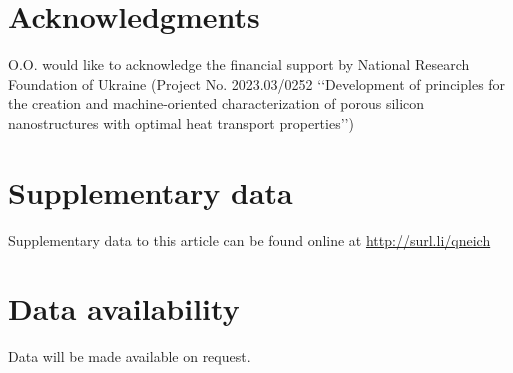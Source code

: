 \documentclass[a4paper,fleqn]{cas-sc}
\begin{document}
\section*{Acknowledgments}
O.O. would like to acknowledge the financial support by
National Research Foundation of Ukraine (Project No. 2023.03/0252
‘‘Development of principles for the creation and machine-oriented
characterization of porous silicon nanostructures with optimal
heat transport properties’’)

\section*{Supplementary data}\label{SuplData}
Supplementary data to this article can be found online at
\url{http://surl.li/qneich}

\section*{Data availability}
Data will be made available on request.





%


\end{document}
